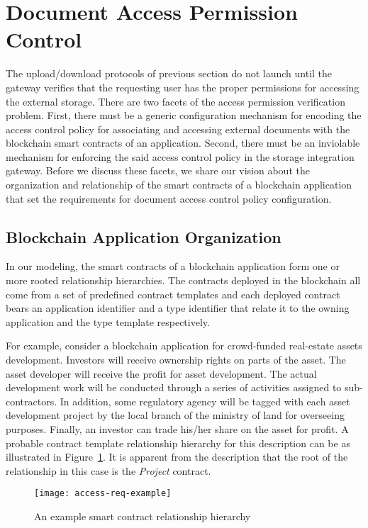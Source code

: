 
\section{Document Access Permission Control}
\label{s-accr}
The upload/download protocols of previous section do not launch until the gateway verifies that the requesting user has the proper permissions for accessing the external storage. There are two facets of the access permission verification problem. First, there must be a generic configuration mechanism for encoding the access control policy for associating and accessing external documents with the blockchain smart contracts of an application. Second, there must be an inviolable mechanism for enforcing the said access control policy in the storage integration gateway. Before we discuss these facets, we share our vision about the organization and relationship of the smart contracts of a blockchain application that set the requirements for document access control policy configuration.

\subsection{Blockchain Application Organization}
In our modeling, the smart contracts of a blockchain application form one or more rooted relationship hierarchies. The contracts deployed in the blockchain all come from a set of predefined contract templates and each deployed contract bears an application identifier and a type identifier that relate it to the owning application and the type template respectively.

For example, consider a blockchain application for crowd-funded real-estate assets development. Investors will receive ownership rights on parts of the asset. The asset developer will receive the profit for asset development. The actual development work will be conducted through a series of activities assigned to sub-contractors. In addition, some regulatory agency will be tagged with each asset development project by the local branch of the ministry of land for overseeing purposes. Finally, an investor can trade his/her share on the asset for profit. A probable contract template relationship hierarchy for this description can be as illustrated in Figure~\ref{fig-2}. It is apparent from the description that the root of the relationship in this case is the {\it Project} contract.
\begin{figure}[h]
\centering
\texttt{[image: access-req-example]}                    
\caption{An example smart contract relationship hierarchy}\label{fig-2}
\end{figure}

